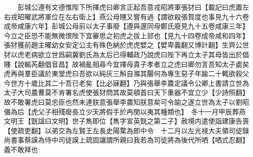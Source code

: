 　　彭城公遵有文德惟陛下所擇虎曰卿言正起吾意戎昭將軍張犲曰【載記曰虎置左右戎昭曜武將軍位在左右衛上】燕公母賤又嘗有過【謂欲殺張賀度也事見九十六卷成帝咸康六年】彭城公母前以太子事廢【遵與邃同母鄭氏廢見九十五卷咸康三年】今立之臣恐不能無微恨陛下宜審思之初虎之拔上邽也【見九十四卷成帝咸和四年】張犲獲前趙主曜幼女安定公主有殊色納於虎虎嬖之【嬖卑義翻又博計翻】生齊公世犲以虎老病欲立世爲嗣冀劉氏為太后已得輔政乃說虎曰陛下再立太子其母皆出於倡賤【說輸芮翻倡音昌】故禍亂相尋今宜擇母貴子孝者立之虎曰卿勿言吾知太子處矣虎再與羣臣議於東堂虎曰吾欲以純灰三斛自滌其腸何為專生惡子年踰二十輒欲殺父今世方十歲比其二十吾已老矣【比必寐翻】乃與張舉李農定議令公卿上書請立世為太子大司農曹莫不肯署名虎使張犲問其故莫頓首曰天下重器不宜立少【少詩照翻】故不敢署虎曰莫忠臣也然未達朕意張舉李農知朕意矣可令諭之遂立世為太子以劉昭儀為后【虎父子相殘廢長立少天將假手於冉閔以夷其種類也】　冬十一月甲辰葬燕文明王【皝諡曰文明】世子雋即位【雋字宣英皝之第二子】赦境内遣使詣建康告喪【使疏吏翻】以弟交為左賢王左長史陽騖為郎中令　十二月以左光禄大夫領司徒錄尚書事蔡謨為侍中司徒謨上疏固讓謂所親曰我若為司徒將為後代所哂【哂式忍翻】義不敢拜也

